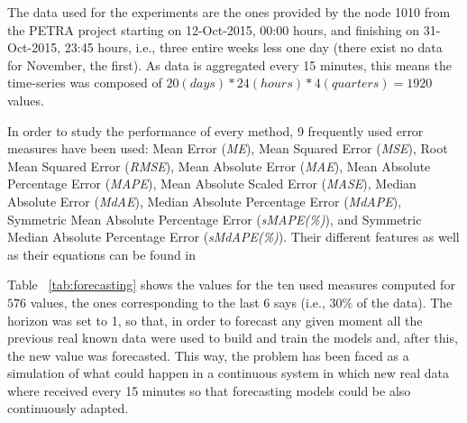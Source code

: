 The data used for the experiments are the ones provided by the node 1010 from the PETRA project starting on 12-Oct-2015, 00:00 hours, and finishing on 31-Oct-2015, 23:45 hours, i.e., three entire weeks less one day (there exist no data for November, the first). As data is aggregated every 15 minutes, this means the time-series was composed of $20(days)*24(hours)*4(quarters)=1920$ values.

In order to study the performance of every method, 9 frequently used error measures have been used:
Mean Error ({\em ME}),
 Mean Squared Error ({\em MSE}),
 Root Mean Squared Error ({\em RMSE}),
 Mean Absolute Error ({\em MAE}),
 Mean Absolute Percentage Error ({\em MAPE}),
 Mean Absolute Scaled Error ({\em MASE}),
 Median Absolute Error ({\em MdAE}),
 Median Absolute Percentage Error ({\em MdAPE}),
 Symmetric Mean Absolute Percentage Error ({\em sMAPE(\%)}), and
 Symmetric Median Absolute Percentage Error ({\em sMdAPE(\%)}).
Their different features as well as their equations can be found in ~\cite{RePEc:eee:intfor:v:22:y:2006:i:4:p:679-688}

Table ~\ref{tab:forecasting} shows the values for the ten used measures computed for $576$ values, the ones corresponding to the last 6 says (i.e., $30\%$ of the data). The horizon was set to 1, so that, in order to forecast any given moment all the previous real known data were used to build and train the models and, after this, the new value was forecasted. This way, the problem has been faced as a simulation of what could happen in a continuous system in which new real data where received every 15 minutes so that forecasting models could be also continuously adapted.






